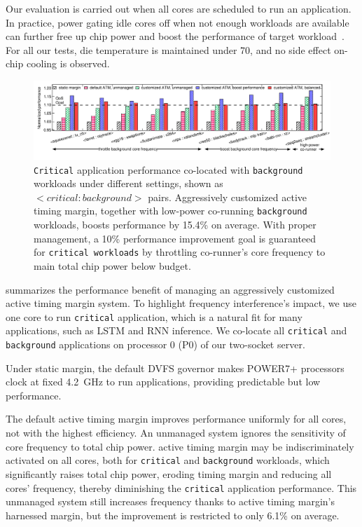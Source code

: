 Our evaluation is carried out when all cores are scheduled to run an application. In practice, power gating idle cores off when not enough workloads are available can further free up chip power and boost the performance of target workload~\cite{zu2015adaptive}. For all our tests, die temperature is maintained under 70\C, and no side effect on-chip cooling is observed. 

\begin{figure}
  \centering
  \includegraphics[trim=10 30 0 0,clip,width=\linewidth]{graphs/process//schedule-1t.pdf}
  \caption{\texttt{Critical} application performance co-located with \texttt{background} workloads under different settings, shown as $<\!critical:background\!>$ pairs. Aggressively customized active timing margin, together with low-power co-running \texttt{background} workloads, boosts performance by 15.4\% on average. With proper management, a 10\% performance improvement goal is guaranteed for \texttt{critical workloads} by throttling co-runner's core frequency to main total chip power below budget.}
  \label{fig:schedule-1t-results}
\end{figure}

 summarizes the performance benefit of managing an aggressively customized active timing margin system. To highlight frequency interference's impact, we use one core to run \texttt{critical} application, which is a natural fit for many applications, such as LSTM and RNN inference. We co-locate all \texttt{critical} and \texttt{background} applications on processor 0 (P0) of our two-socket server.

Under static margin, the default DVFS governor makes POWER7+ processors clock at fixed 4.2~GHz to run applications, providing predictable but low performance. 

The default active timing margin improves performance uniformly for all cores, not with the highest efficiency. An unmanaged system ignores the sensitivity of core frequency to total chip power. active timing margin may be indiscriminately activated on all cores, both for \texttt{critical} and \texttt{background} workloads, which significantly raises total chip power, eroding timing margin and reducing all cores' frequency, thereby diminishing the \texttt{critical} application performance. This unmanaged system still increases frequency thanks to active timing margin's harnessed margin, but the improvement is restricted to only 6.1\% on average.

